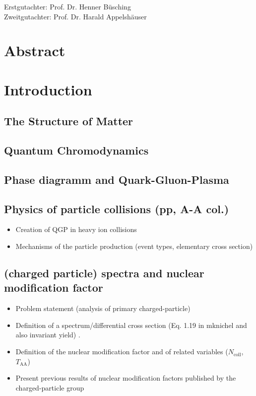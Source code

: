 \documentclass[12pt,a4paper]{report}
\begin{document}
\vspace*{22cm}
\large{Erstgutachter: Prof. Dr. Henner Büsching}\\
\large{Zweitgutachter: Prof. Dr. Harald Appelshäuser}
\normalsize
{}
\newpage
\tableofcontents
\newpage

\setcounter{chapter}{-1}
\chapter{Abstract}

\chapter{Introduction}
\label{cha:StdModel}
\section{The Structure of Matter}
\label{sec:DasSMT}
\section{Quantum Chromodynamics}
\section{Phase diagramm and Quark-Gluon-Plasma}
\section{Physics of particle collisions (pp, A-A col.)}
\begin{itemize}
\item Creation of QGP in heavy ion collisions
\item Mechanisms of the particle production (event types, elementary cross section)
\end{itemize}
\section{(charged particle) \pt spectra and nuclear modification factor}
\begin{itemize}
\item Problem statement (analysis of primary charged-particle)
\item Definition of a \pt spectrum/differential cross section (Eq. 1.19 in mknichel and also invariant yield) .
\item Definition of the nuclear modification factor and of related variables ($N_\text{coll}$, $T_\text{AA}$)
\item Present previous results of nuclear modification factors published by the charged-particle group
\end{itemize}
\end{document}

